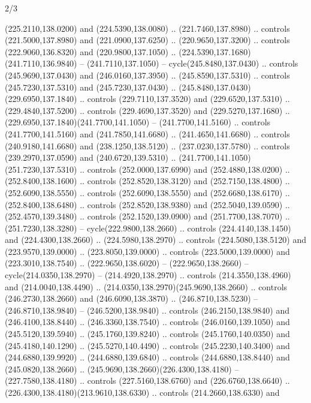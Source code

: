 \begin{flagdescription}{2/3}
\begin{scope}[xshift=0.5\flaglength,yshift=0.5\flagwidth,scale=\flagwidth/259.2]
\begin{scope}[y=0.8pt, x=0.8pt, yscale=-1,shift={(-243,-162)}]
      (225.2110,138.0200) and (224.5390,138.0080) .. (221.7460,137.8980) .. controls
      (221.5000,137.8980) and (221.0900,137.6250) .. (220.9650,137.3200) .. controls
      (222.9060,136.8320) and (220.9800,137.1050) ..
      (224.5390,137.1680)(241.7110,136.9840) -- (241.7110,137.1050) --
      cycle(245.8480,137.0430) .. controls (245.9690,137.0430) and
      (246.0160,137.3950) .. (245.8590,137.5310) .. controls (245.7230,137.5310) and
      (245.7230,137.0430) .. (245.8480,137.0430)(229.6950,137.1840) .. controls
      (229.7110,137.3520) and (229.6520,137.5310) .. (229.4840,137.5200) .. controls
      (229.4690,137.3520) and (229.5270,137.1680) ..
      (229.6950,137.1840)(241.7700,141.1050) -- (241.7700,141.5160) .. controls
      (241.7700,141.5160) and (241.7850,141.6680) .. (241.4650,141.6680) .. controls
      (240.9180,141.6680) and (238.1250,138.5120) .. (237.0230,137.5780) .. controls
      (239.2970,137.0590) and (240.6720,139.5310) ..
      (241.7700,141.1050)(251.7230,137.5310) .. controls (252.0000,137.6990) and
      (252.4880,138.0200) .. (252.8400,138.1600) .. controls (252.8520,138.3120) and
      (252.7150,138.4800) .. (252.6090,138.5550) .. controls (252.6090,138.5550) and
      (252.6680,138.6170) .. (252.8400,138.6480) .. controls (252.8520,138.9380) and
      (252.5040,139.0590) .. (252.4570,139.3480) .. controls (252.1520,139.0900) and
      (251.7700,138.7070) .. (251.7230,138.3280) -- cycle(222.9800,138.2660) ..
      controls (224.4140,138.1450) and (224.4300,138.2660) .. (224.5980,138.2970) ..
      controls (224.5080,138.5120) and (223.9570,139.0000) .. (223.8050,139.0000) ..
      controls (223.5000,139.0000) and (223.3010,138.7540) .. (222.9650,138.6020) --
      (222.9650,138.2660) -- cycle(214.0350,138.2970) -- (214.4920,138.2970) ..
      controls (214.3550,138.4960) and (214.0040,138.4490) ..
      (214.0350,138.2970)(245.9690,138.2660) .. controls (246.2730,138.2660) and
      (246.6090,138.3870) .. (246.8710,138.5230) -- (246.8710,138.9840) --
      (246.5200,138.9840) .. controls (246.2150,138.9840) and (246.4100,138.8440) ..
      (246.3360,138.7540) .. controls (246.0160,139.1050) and (245.5120,139.5940) ..
      (245.1760,139.8240) .. controls (245.1760,140.0350) and (245.4180,140.1290) ..
      (245.5270,140.4490) .. controls (245.2230,140.3400) and (244.6880,139.9920) ..
      (244.6880,139.6840) .. controls (244.6880,138.8440) and (245.0820,138.2660) ..
      (245.9690,138.2660)(226.4300,138.4180) -- (227.7580,138.4180) .. controls
      (227.5160,138.6760) and (226.6760,138.6640) ..
      (226.4300,138.4180)(213.9610,138.6330) .. controls (214.2660,138.6330) and

\end{scope}
\end{scope}
\end{flagdescription}
